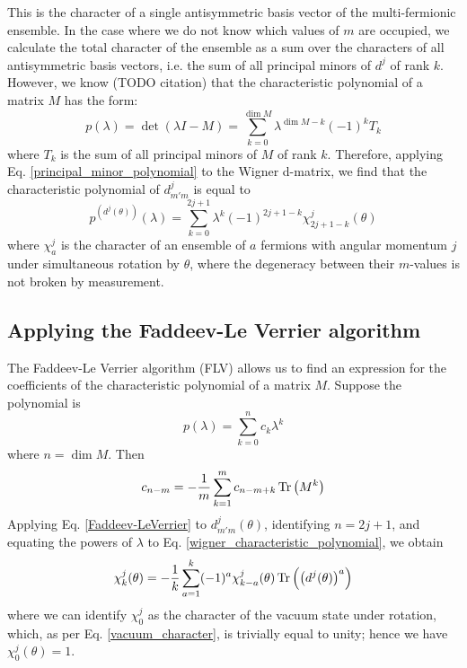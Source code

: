 \documentclass[12pt]{article}
\begin{document}
	This is the character of a single antisymmetric basis vector of the multi-fermionic ensemble. In the case where we do not know which values of $m$ are occupied, we calculate the total character of the ensemble as a sum over the characters of all antisymmetric basis vectors, i.e. the sum of all principal minors of $d^j$ of rank $k$. However, we know (TODO citation) that the characteristic polynomial of a matrix $M$ has the form:
	\begin{equation} \label{principal_minor_polynomial}
	p(\lambda)=\det(\lambda I - M) = \sum_{k=0}^{\dim M}\lambda^{\dim M-k}(-1)^k T_k
	\end{equation}
	where $T_k$ is the sum of all principal minors of $M$ of rank $k$. Therefore, applying Eq. \ref{principal_minor_polynomial} to the Wigner d-matrix, we find that the characteristic polynomial of $d^j_{m'm}$ is equal to
	\begin{equation} \label{wigner_characteristic_polynomial}
	p^{\left(d^j(\theta)\right)}(\lambda) = \sum_{k=0}^{2j+1}\lambda^{k}(-1)^{2j+1-k} \chi^j_{2j+1-k}(\theta)
	\end{equation}
	where $\chi^j_a$ is the character of an ensemble of $a$ fermions with angular momentum $j$ under simultaneous rotation by $\theta$, where the degeneracy between their $m$-values is not broken by measurement.
	
	\subsection{Applying the Faddeev-Le Verrier algorithm}
	The Faddeev-Le Verrier algorithm (FLV) allows us to find an expression for the coefficients of the characteristic polynomial of a matrix $M$. Suppose the polynomial is
	$$p(\lambda)=\sum_{k=0}^n c_k \lambda^k$$
	where $n=\dim M$. Then
	\begin{equation} \label{Faddeev-LeVerrier}
	c_{n-m} = -\frac{1}{m}\sum_{k=1}^m c_{n-m+k} \Tr\left(M^k\right)
	\end{equation}
	Applying Eq. \ref{Faddeev-LeVerrier} to $d^j_{m'm}(\theta)$, identifying $n=2j+1$, and equating the powers of $\lambda$ to Eq. \ref{wigner_characteristic_polynomial}, we obtain
	\begin{equation}
	\chi^j_k(\theta)=-\frac{1}{k}\sum_{a=1}^k (-1)^{a}\chi^j_{k-a}(\theta)\Tr\left(\left(d^j(\theta)\right)^a\right)
	\end{equation}
	where we can identify $\chi^j_0$ as the character of the vacuum state under rotation, which, as per Eq. \ref{vacuum_character}, is trivially equal to unity; hence we have $\chi^j_0(\theta)=1$.
	
\end{document}
